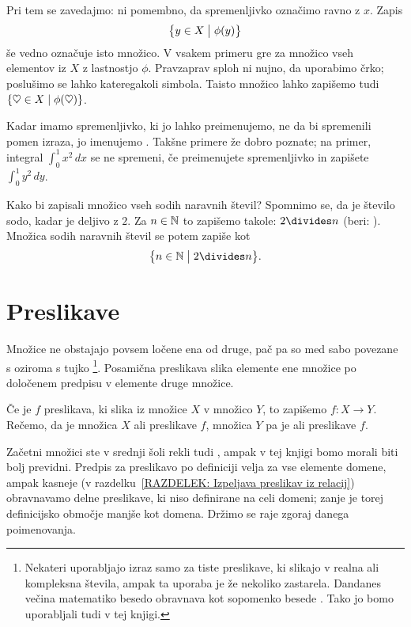 		Pri tem se zavedajmo: ni pomembno, da spremenljivko označimo ravno z $x$. Zapis
		\[\set[1]{y \in X}{\phi(y)}\]
		še vedno označuje isto množico. V vsakem primeru gre za množico vseh elementov iz $X$ z lastnostjo $\phi$. Pravzaprav sploh ni nujno, da uporabimo črko; poslušimo se lahko kateregakoli simbola. Taisto množico lahko zapišemo tudi $\set{\heartsuit \in X}{\phi(\heartsuit)}$.
		
		Kadar imamo spremenljivko, ki jo lahko preimenujemo, ne da bi spremenili pomen izraza, jo imenujemo . Takšne primere že dobro poznate; na primer, integral $\int_0^1 x^2 \,dx$ se ne spremeni, če preimenujete spremenljivko in zapišete $\int_0^1 y^2 \,dy$.
		
		\begin{zgled}
			Kako bi zapisali množico vseh sodih naravnih števil? Spomnimo se, da je število sodo, kadar je deljivo z $2$. Za $n \in \mathbb{N}$ to zapišemo takole: $2 \divides n$ (beri: ). Množica sodih naravnih števil se potem zapiše kot
			\[\set[1]{n \in \NN}{2 \divides n}.\]
		\end{zgled}
	
	
	\section{Preslikave}
	
		Množice ne obstajajo povsem ločene ena od druge, pač pa so med sabo povezane s  oziroma s tujko \footnote{Nekateri uporabljajo izraz  samo za tiste preslikave, ki slikajo v realna ali kompleksna števila, ampak ta uporaba je že nekoliko zastarela. Dandanes večina matematiko besedo  obravnava kot sopomenko besede . Tako jo bomo uporabljali tudi v tej knjigi.}. Posamična preslikava slika elemente ene množice po določenem predpisu v elemente druge množice.
		
		Če je $f$ preslikava, ki slika iz množice $X$ v množico $Y$, to zapišemo $f\colon X \to Y$. Rečemo, da je množica $X$  ali  preslikave $f$, množica $Y$ pa je  ali  preslikave $f$.
		
		Začetni množici ste v srednji šoli rekli tudi , ampak v tej knjigi bomo morali biti bolj previdni. Predpis za preslikavo po definiciji velja za vse elemente domene, ampak kasneje (v razdelku~\ref{RAZDELEK: Izpeljava preslikav iz relacij}) obravnavamo delne preslikave, ki niso definirane na celi domeni; zanje je torej definicijsko območje manjše kot domena. Držimo se raje zgoraj danega poimenovanja.
		
